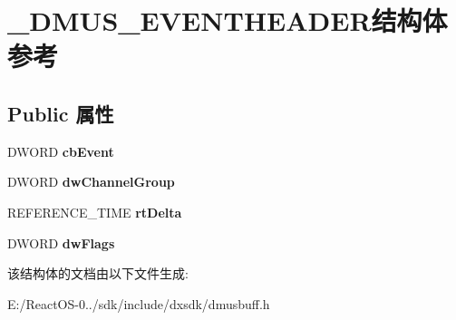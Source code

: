 \hypertarget{struct___d_m_u_s___e_v_e_n_t_h_e_a_d_e_r}{}\section{\+\_\+\+D\+M\+U\+S\+\_\+\+E\+V\+E\+N\+T\+H\+E\+A\+D\+E\+R结构体 参考}
\label{struct___d_m_u_s___e_v_e_n_t_h_e_a_d_e_r}
\subsection*{Public 属性}
\begin{DoxyCompactItemize}
\item 
\mbox{\label{struct___d_m_u_s___e_v_e_n_t_h_e_a_d_e_r_a89427bfa60d1d97984506f958ae2d301}} 
D\+W\+O\+RD {\bfseries cb\+Event}
\item 
\mbox{\label{struct___d_m_u_s___e_v_e_n_t_h_e_a_d_e_r_a1dcfbc33afbade4a00598311dd9c706e}} 
D\+W\+O\+RD {\bfseries dw\+Channel\+Group}
\item 
\mbox{\label{struct___d_m_u_s___e_v_e_n_t_h_e_a_d_e_r_a4799f098c7f30794393b9fc5e9809a26}} 
R\+E\+F\+E\+R\+E\+N\+C\+E\+\_\+\+T\+I\+ME {\bfseries rt\+Delta}
\item 
\mbox{\label{struct___d_m_u_s___e_v_e_n_t_h_e_a_d_e_r_afa51d87dd5e4737b7ceaff7fc538d3da}} 
D\+W\+O\+RD {\bfseries dw\+Flags}
\end{DoxyCompactItemize}


该结构体的文档由以下文件生成\+:\begin{DoxyCompactItemize}
\item 
E\+:/\+React\+O\+S-\/0../sdk/include/dxsdk/dmusbuff.\+h\end{DoxyCompactItemize}
